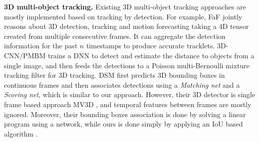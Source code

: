 \documentclass[letterpaper, 10pt, conference]{ieeeconf}  %
\begin{document}



\textbf{3D multi-object tracking.} Existing 3D multi-object tracking approaches are mostly implemented based on tracking by detection. For example, FaF \cite{luo2018fast} jointly reasons about 3D detection, tracking and motion forecasting taking a 4D tensor created from multiple consecutive frames. It can aggregate the detection information for the past $n$ timestamps to produce accurate tracklets. 3D-CNN/PMBM \cite{scheidegger2018mono} trains a DNN to detect and estimate the distance to objects from a single image, and then feeds the detections to a Poisson multi-Bernoulli mixture tracking filter for 3D tracking. DSM \cite{frossard2018end} first predicts 3D bounding boxes in continuous frames and then associates detections using a \textit{Matching net} and a \textit{Scoring net}, which is similar to our approach. However, their 3D detector is single frame based approach MV3D \cite{chen2017multi}, and temporal features between frames are mostly ignored. Moreover, their bounding boxes association is done by solving a linear program using a network, while ours is done simply by applying an IoU based algorithm \cite{bochinski2018extending}.
\end{document}
